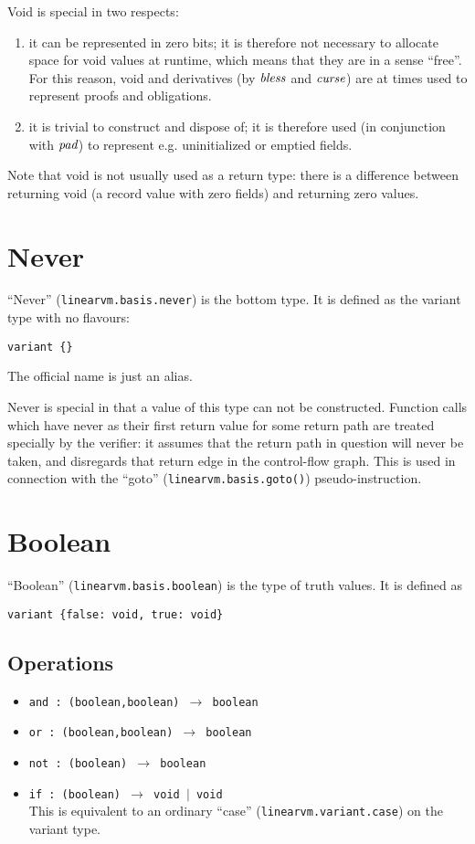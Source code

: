 \documentclass[a4paper]{book}
\newcommand\tyBless{{\ensuremath{\textnormal{\textit{bless}}}}}
\newcommand\tyCurse{{\ensuremath\textit{curse}}}
\newcommand\tyPad{{\ensuremath\textit{pad}}}
\begin{document}
Void is special in two respects:
\begin{enumerate}
\item it can be represented in zero bits;
  it is therefore not necessary to allocate space for void values at
  runtime, which means that they are in a sense ``free''.
  For this reason, void and derivatives (by $\tyBless$ and
  $\tyCurse$) are at times used to represent proofs and obligations.
\item it is trivial to construct and dispose of;
  it is therefore used (in conjunction with $\tyPad$) to represent e.g.
  uninitialized or emptied fields.
\end{enumerate}

Note that void is not usually used as a return type: there is a
difference between returning void (a record value with zero fields)
and returning zero values.

\section{Never}
``Never'' (\texttt{linearvm.basis.never}) is the bottom type.
It is defined as the variant type with no flavours:
\begin{center}
  \verb|variant {}|
\end{center}
The official name is just an alias.

Never is special in that a value of this type can not be constructed.
Function calls which have never as their first return value for some return
path are treated specially by the verifier: it assumes that the return
path in question will never be taken, and disregards that return edge
in the control-flow graph.
This is used in connection with the ``goto'' (\texttt{linearvm.basis.goto()})
pseudo-instruction.

\section{Boolean}
``Boolean'' (\texttt{linearvm.basis.boolean}) is the type of truth values.
It is defined as
\begin{center}
  \verb|variant {false: void, true: void}|
\end{center}

\subsection*{Operations}

\begin{itemize}
\item \texttt{and : (boolean,boolean) $\to$ boolean }
\item \texttt{or : (boolean,boolean) $\to$ boolean }
\item \texttt{not : (boolean) $\to$ boolean }
\item \texttt{if : (boolean) $\to$ void $|$ void }
  \\ This is equivalent to an ordinary ``case''
  (\texttt{linearvm.variant.case}) on the variant type.
\end{itemize}
\end{document}
